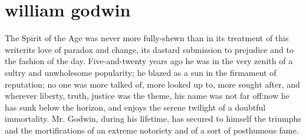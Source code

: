 \chapter[William Godwin]{william godwin} 

The Spirit of the Age was never more fully-shewn than in its
treatment of this writer\textemdash its love of paradox and
change, its dastard submission to prejudice and to the fashion of
the day. Five-and-twenty years ago he was in the very zenith of a
sultry and unwholesome popularity; he blazed as a sun in the
firmament of reputation; no one was more talked of, more looked up
to, more sought after, and wherever liberty, truth, justice was
the theme, his name was not far off:\textemdash now he has sunk
below the horizon, and enjoys the serene twilight of a doubtful
immortality. Mr.  Godwin, during his lifetime, has secured to
himself the triumphs and the mortifications of an extreme
notoriety and of a sort of posthumous fame.


